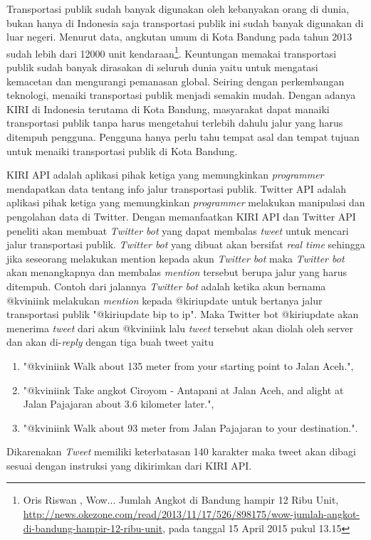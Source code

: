 Transportasi publik sudah banyak digunakan oleh kebanyakan orang di dunia, bukan hanya di Indonesia saja transportasi publik ini sudah banyak digunakan di luar negeri. Menurut data, angkutan umum di Kota Bandung pada tahun 2013 sudah lebih dari 12000 unit kendaraan\footnote{Oris Riswan , Wow... Jumlah Angkot di Bandung hampir 12 Ribu Unit, \url{http://news.okezone.com/read/2013/11/17/526/898175/wow-jumlah-angkot-di-bandung-hampir-12-ribu-unit}, pada tanggal 15 April 2015 pukul 13.15}. Keuntungan memakai transportasi publik sudah banyak dirasakan di seluruh dunia yaitu untuk mengatasi kemacetan dan mengurangi pemanasan global. Seiring dengan perkembangan teknologi, menaiki transportasi publik menjadi semakin mudah. Dengan adanya KIRI di Indonesia terutama di Kota Bandung, masyarakat dapat manaiki  transportasi publik tanpa harus mengetahui terlebih dahulu jalur yang harus ditempuh pengguna. Pengguna hanya perlu tahu tempat asal dan tempat tujuan untuk menaiki transportasi publik di Kota Bandung.

KIRI API adalah aplikasi pihak ketiga yang memungkinkan \textit{programmer} mendapatkan data tentang info jalur transportasi publik. Twitter API adalah aplikasi pihak ketiga yang memungkinkan \textit{programmer} melakukan manipulasi dan pengolahan data di Twitter. Dengan memanfaatkan KIRI API dan Twitter API peneliti akan membuat \textit{Twitter bot} yang dapat membalas \textit{tweet} untuk mencari jalur transportasi publik. \textit{Twitter bot} yang dibuat akan bersifat \textit{real time} sehingga jika seseorang melakukan mention kepada akun \textit{Twitter bot} maka \textit{Twitter bot} akan menangkapnya dan membalas \textit{mention} tersebut berupa jalur yang harus ditempuh. Contoh dari jalannya \textit{Twitter bot} adalah ketika akun bernama @kviniink melakukan \textit{mention} kepada @kiriupdate untuk bertanya jalur transportasi publik "@kiriupdate bip to ip". Maka Twitter bot @kiriupdate akan menerima \textit{tweet} dari akun @kviniink lalu \textit{tweet} tersebut akan diolah oleh server dan akan di-\textit{reply} dengan tiga buah tweet  yaitu 
\begin{enumerate}
	\item "@kviniink Walk about 135 meter from your starting point to Jalan Aceh.",
	\item "@kviniink Take angkot Ciroyom - Antapani at Jalan Aceh, and alight at Jalan Pajajaran about 3.6 kilometer later.",
	\item "@kviniink Walk about 93 meter from Jalan Pajajaran to your destination.".
\end{enumerate}
Dikarenakan \textit{Tweet} memiliki keterbatasan 140 karakter maka tweet akan dibagi sesuai dengan instruksi yang dikirimkan dari KIRI API.

